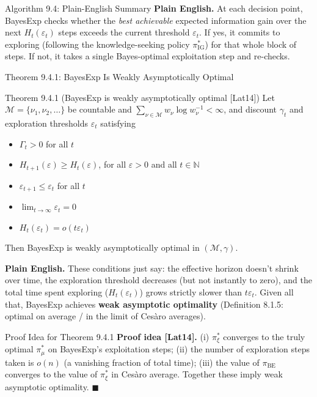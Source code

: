 \documentclass[aspectratio=169,10pt]{beamer}
\newcommand{\N}{\mathbb{N}}
\newcommand{\IG}{\mathrm{IG}}
\begin{document}
\begin{frame}{Algorithm 9.4: Plain-English Summary}
  \textbf{Plain English.} At each decision point, BayesExp checks whether
  the \emph{best achievable} expected information gain over the next
  $H_t(\varepsilon_t)$ steps exceeds the current threshold $\varepsilon_t$.
  If yes, it commits to exploring (following the knowledge-seeking policy
  $\pi^*_{\IG}$) for that whole block of steps. If not, it takes a single
  Bayes-optimal exploitation step and re-checks.
\end{frame}

\begin{frame}{Theorem 9.4.1: BayesExp Is Weakly Asymptotically Optimal}
  \begin{block}{Theorem 9.4.1 (BayesExp is weakly asymptotically optimal [Lat14])}
    Let $\mathcal{M}=\{\nu_1,\nu_2,\dots\}$ be countable and
    $\sum_{\nu\in\mathcal{M}} w_\nu\log w_\nu^{-1}<\infty$, and discount
    $\gamma_t$ and exploration thresholds $\varepsilon_t$ satisfying
    \begin{itemize}
      \item $\Gamma_t>0$ for all $t$
      \item $H_{t+1}(\varepsilon)\ge H_t(\varepsilon)$, for all
        $\varepsilon>0$ and all $t\in\N$
      \item $\varepsilon_{t+1}\le\varepsilon_t$ for all $t$
      \item $\lim_{t\to\infty}\varepsilon_t=0$
      \item $H_t(\varepsilon_t)=o(t\varepsilon_t)$
    \end{itemize}
    Then BayesExp is weakly asymptotically optimal in $(\mathcal{M},\gamma)$.
  \end{block}
  \textbf{Plain English.} These conditions just say: the effective horizon
  doesn't shrink over time, the exploration threshold decreases (but not
  instantly to zero), and the total time spent exploring
  ($H_t(\varepsilon_t)$) grows strictly slower than $t\varepsilon_t$. Given
  all that, BayesExp achieves \textbf{weak asymptotic optimality}
  (Definition 8.1.5: optimal on average / in the limit of Cesàro averages).
\end{frame}

\begin{frame}{Proof Idea for Theorem 9.4.1}
  \textbf{Proof idea [Lat14].} (i) $\pi^*_\xi$ converges to the truly
  optimal $\pi^*_\mu$ on BayesExp's exploitation steps; (ii) the number of
  exploration steps taken is $o(n)$ (a vanishing fraction of total time);
  (iii) the value of $\pi_{\mathrm{BE}}$ converges to the value of
  $\pi^*_\xi$ in Cesàro average. Together these imply weak asymptotic
  optimality. $\blacksquare$
\end{frame}
\end{document}
